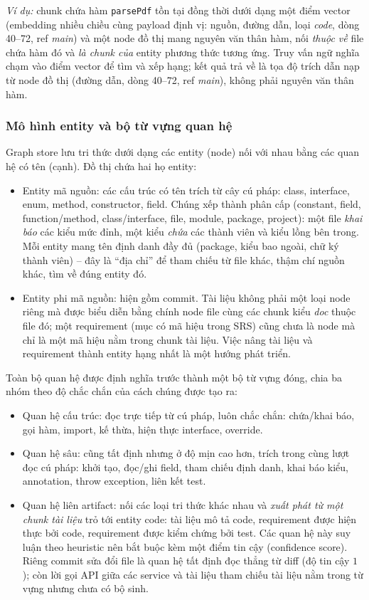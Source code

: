 \textit{Ví dụ:} chunk chứa hàm \texttt{parsePdf} tồn tại đồng thời dưới dạng một điểm vector (embedding nhiều chiều cùng payload định vị: nguồn, đường dẫn, loại \textit{code}, dòng 40--72, ref \textit{main}) và một node đồ thị mang nguyên văn thân hàm, nối \textit{thuộc về} file chứa hàm đó và \textit{là chunk của} entity phương thức tương ứng. Truy vấn ngữ nghĩa chạm vào điểm vector để tìm và xếp hạng; kết quả trả về là tọa độ trích dẫn nạp từ node đồ thị (đường dẫn, dòng 40--72, ref \textit{main}), không phải nguyên văn thân hàm.

\subsubsection{Mô hình entity và bộ từ vựng quan hệ}

Graph store lưu tri thức dưới dạng các entity (node) nối với nhau bằng các quan hệ có tên (cạnh). Đồ thị chứa hai họ entity:

\begin{itemize}
  \item Entity mã nguồn: các cấu trúc có tên trích từ cây cú pháp: class, interface, enum, method, constructor, field. Chúng xếp thành phân cấp (constant, field, function/method, class/interface, file, module, package, project): một file \textit{khai báo} các kiểu mức đỉnh, một kiểu \textit{chứa} các thành viên và kiểu lồng bên trong. Mỗi entity mang tên định danh đầy đủ (package, kiểu bao ngoài, chữ ký thành viên) -- đây là ``địa chỉ'' để tham chiếu từ file khác, thậm chí nguồn khác, tìm về đúng entity đó.
  \item Entity phi mã nguồn: hiện gồm commit. Tài liệu không phải một loại node riêng mà được biểu diễn bằng chính node file cùng các chunk kiểu \textit{doc} thuộc file đó; một requirement (mục có mã hiệu trong SRS) cũng chưa là node mà chỉ là một mã hiệu nằm trong chunk tài liệu. Việc nâng tài liệu và requirement thành entity hạng nhất là một hướng phát triển.
\end{itemize}

Toàn bộ quan hệ được định nghĩa trước thành một bộ từ vựng đóng, chia ba nhóm theo độ chắc chắn của cách chúng được tạo ra:

\begin{itemize}
  \item Quan hệ cấu trúc: đọc trực tiếp từ cú pháp, luôn chắc chắn: chứa/khai báo, gọi hàm, import, kế thừa, hiện thực interface, override.
  \item Quan hệ sâu: cũng tất định nhưng ở độ mịn cao hơn, trích trong cùng lượt đọc cú pháp: khởi tạo, đọc/ghi field, tham chiếu định danh, khai báo kiểu, annotation, throw exception, liên kết test.
  \item Quan hệ liên artifact: nối các loại tri thức khác nhau và \textit{xuất phát từ một chunk tài liệu} trỏ tới entity code: tài liệu mô tả code, requirement được hiện thực bởi code, requirement được kiểm chứng bởi test. Các quan hệ này suy luận theo heuristic nên bắt buộc kèm một điểm tin cậy (confidence score). Riêng commit sửa đổi file là quan hệ tất định đọc thẳng từ diff (độ tin cậy $1$); còn lời gọi API giữa các service và tài liệu tham chiếu tài liệu nằm trong từ vựng nhưng chưa có bộ sinh.
\end{itemize}


